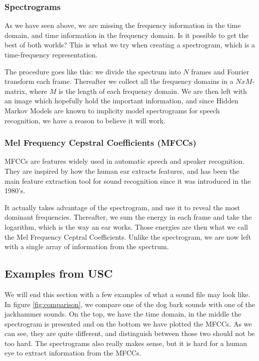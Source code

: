 \subsubsection{Spectrograms}
As we have seen above, we are missing the frequency information in the time domain, and time information in the frequency domain. Is it possible to get the best of both worlds? This is what we try when creating a spectrogram, which is a time-frequency representation. 

The procedure goes like this: we divide the spectrum into $N$ frames and Fourier transform each frame. Thereafter we collect all the frequency domains in a $NxM$-matrix, where $M$ is the length of each frequency domain. We are then left with an image which hopefully hold the important information, and since Hidden Markov Models are known to implicity model spectrograms for speech recognition, we have a reason to believe it will work. \cite{spectrograms}

\subsubsection{Mel Frequency Cepstral Coefficients (MFCCs)}
MFCCs are features widely used in automatic speech and speaker recognition. \cite{mfcc} They are inspired by how the human ear extracts features, and has been the main feature extraction tool for sound recognition since it was introduced in the 1980's. 

It actually takes advantage of the spectrogram, and use it to reveal the most dominant frequencies. Thereafter, we sum the energy in each frame and take the logarithm, which is the way an ear works. Those energies are then what we call the Mel Frequency Ceptral Coefficients. Unlike the spectrogram, we are now left with a single array of information from the spectrum. 

\subsection{Examples from USC}
We will end this section with a few examples of what a sound file may look like. In figure \eqref{fig:comparison}, we compare one of the dog bark sounds with one of the jackhammer sounds. On the top, we have the time domain, in the middle the spectrogram is presented and on the bottom we have plotted the MFCCs. As we can see, they are quite different, and distinguish between those two should not be too hard. The spectrograms also really makes sense, but it is hard for a human eye to extract information from the MFCCs. 

